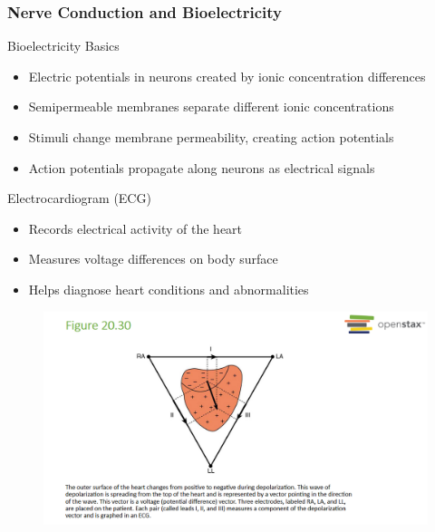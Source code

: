\documentclass{beamer}
\begin{document}
\begin{frame}
    \frametitle{Nerve Conduction and Bioelectricity}
    \begin{block}{Bioelectricity Basics}
        \begin{itemize}
            \item Electric potentials in neurons created by ionic concentration differences
            \item Semipermeable membranes separate different ionic concentrations
            \item Stimuli change membrane permeability, creating action potentials
            \item Action potentials propagate along neurons as electrical signals
        \end{itemize}
    \end{block}
    \begin{block}{Electrocardiogram (ECG)}
        \begin{itemize}
            \item Records electrical activity of the heart
            \item Measures voltage differences on body surface
            \item Helps diagnose heart conditions and abnormalities
        \end{itemize}
    \end{block}
   
\end{frame}
\begin{frame}{}
    \begin{figure}
        \centering
        \includegraphics[width=1\linewidth]{phys12-circuits-ecg-waveform.png}
    \end{figure}
\end{frame}
\end{document}

